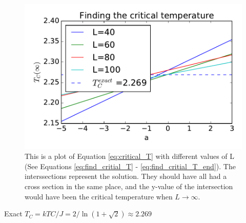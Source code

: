 \begin{figure}[H]
\includegraphics[width=\linewidth]{../results/4f/critical_t}\caption{This is a plot of Equation \ref{eq:critical_T} with different values of L (See Equations \ref{eq:find_critial_T} - \ref{eq:find_critial_T_end}). The interssections represent the solution. They should have all had a cross section in the same place, and the y-value of the intersection would have been the critical temperature when $L \rightarrow \infty$.}\label{fig:critical_T}
\end{figure}

Exact $T_C =  kTC/J = 2/ \ln(1+\sqrt{
2}) \approx 2.269$ \cite{Onsager}
